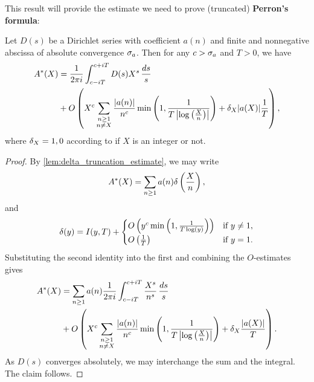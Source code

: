     This result will provide the estimate we need to prove (truncated) \textbf{Perron's formula}:

    \begin{theorem*}
      Let \(D(s)\) be a Dirichlet series with coefficient \(a(n)\) and finite and nonnegative abscissa of absolute convergence \(\sigma_{a}\). Then for any \(c > \sigma_{a}\) and \(T > 0\), we have
      \begin{align*}
        A^{\ast}(X) &= \frac{1}{2\pi i}\int_{c-iT}^{c+iT}D(s)X^{s}\,\frac{ds}{s} \\
        &+ O\left(X^{c}\sum_{\substack{n \ge 1 \\ n \neq X}}\frac{|a(n)|}{n^{c}}\min\left(1,\frac{1}{T\left|\log\left(\frac{X}{n}\right)\right|}\right)+\delta_{X}|a(X)|\frac{1}{T}\right),
      \end{align*}
      where \(\delta_{X} = 1,0\) according to if \(X\) is an integer or not.
    \end{theorem*}
    \begin{proof}
      By \cref{lem:delta_truncation_estimate}, we may write
      \[
        A^{\ast}(X) = \sum_{n \ge 1}a(n)\delta\left(\frac{X}{n}\right),
      \]
      and
      \[
        \delta(y) = I(y,T)+\begin{cases} O\left(y^{c}\min\left(1,\frac{1}{T\log(y)}\right)\right) & \text{if \(y \neq 1\)}, \\ O\left(\frac{1}{T}\right) & \text{if \(y = 1\)}. \end{cases}
      \] 
      Substituting the second identity into the first and combining the \(O\)-estimates gives
      \begin{align*}
        A^{\ast}(X) &= \sum_{n \ge 1}a(n)\frac{1}{2\pi i}\int_{c-iT}^{c+iT}\frac{X^{s}}{n^{s}}\,\frac{ds}{s} \\
        &+ O\left(X^{c}\sum_{\substack{n \ge 1 \\ n \neq X}}\frac{|a(n)|}{n^{c}}\min\left(1,\frac{1}{T\left|\log\left(\frac{X}{n}\right)\right|}\right)+\delta_{X}\frac{|a(X)|}{T}\right).
      \end{align*}
      As \(D(s)\) converges absolutely, we may interchange the sum and the integral. The claim follows. 
    \end{proof}

